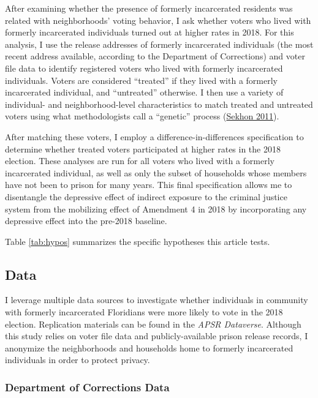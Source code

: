 \documentclass[
  12pt,
]{article}
\begin{document}
After examining whether the presence of formerly incarcerated residents was related with neighborhoods' voting behavior, I ask whether voters who lived with formerly incarcerated individuals turned out at higher rates in 2018. For this analysis, I use the release addresses of formerly incarcerated individuals (the most recent address available, according to the Department of Corrections) and voter file data to identify registered voters who lived with formerly incarcerated individuals. Voters are considered ``treated'' if they lived with a formerly incarcerated individual, and ``untreated'' otherwise. I then use a variety of individual- and neighborhood-level characteristics to match treated and untreated voters using what methodologists call a ``genetic'' process (\protect\hyperlink{ref-Sekhon2011}{Sekhon 2011}).

After matching these voters, I employ a difference-in-differences specification to determine whether treated voters participated at higher rates in the 2018 election. These analyses are run for all voters who lived with a formerly incarcerated individual, as well as only the subset of households whose members have not been to prison for many years. This final specification allows me to disentangle the depressive effect of indirect exposure to the criminal justice system from the mobilizing effect of Amendment 4 in 2018 by incorporating any depressive effect into the pre-2018 baseline.

Table \ref{tab:hypos} summarizes the specific hypotheses this article tests.



\hypertarget{data}{%
\subsection*{Data}\label{data}}

I leverage multiple data sources to investigate whether individuals in community with formerly incarcerated Floridians were more likely to vote in the 2018 election. Replication materials can be found in the \emph{APSR Dataverse}. Although this study relies on voter file data and publicly-available prison release records, I anonymize the neighborhoods and households home to formerly incarcerated individuals in order to protect privacy.

\hypertarget{department-of-corrections-data}{%
\subsubsection*{Department of Corrections Data}\label{department-of-corrections-data}}
\end{document}
